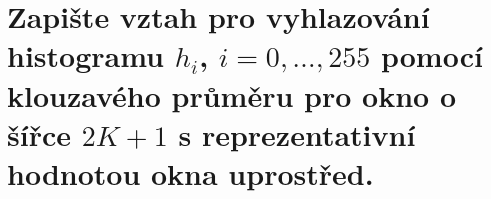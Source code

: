 \section{Zapište vztah pro vyhlazování histogramu $h_i$, $i=0,\dots,255$ pomocí klouzavého průměru pro okno o šířce 
$2K+1$ s reprezentativní hodnotou okna uprostřed.}